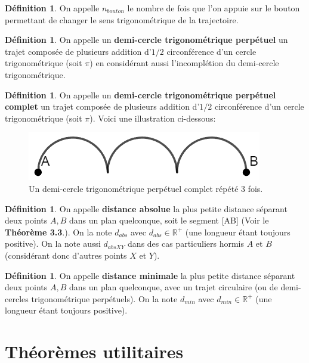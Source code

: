 \documentclass{amsart}
\theoremstyle{definition}
\newtheorem{definition}[theorem]{Définition}
\theoremstyle{remark}
\numberwithin{equation}{section}
\begin{document}
\begin{definition}
  On appelle $n_{bouton}$ le nombre de fois que l'on appuie sur le bouton permettant de changer le sens trigonométrique de la trajectoire.
\end{definition}

\begin{definition}
  On appelle un \textbf{demi-cercle trigonométrique perpétuel} un trajet composée de plusieurs addition d'$1/2$ circonférence d'un cercle trigonométrique (soit $\pi$) en considérant aussi l'incomplétion du demi-cercle trigonométrique.
\end{definition}

\begin{definition}
  On appelle un \textbf{demi-cercle trigonométrique perpétuel complet} un trajet composée de plusieurs addition d'$1/2$ circonférence d'un cercle trigonométrique (soit $\pi$). Voici une illustration ci-dessous:
  
  \begin{figure}[H]
    \centering
    \includegraphics[scale=0.5]{demicircle.png}
    \caption{Un demi-cercle trigonométrique perpétuel complet répété 3 fois.}
  \end{figure}
\end{definition}

\begin{definition}
  On appelle \textbf{distance absolue} la plus petite distance séparant deux points $A,B$ dans un plan quelconque, soit le segment [AB] (Voir le \textbf{Théorème 3.3}.). On la note $d_{abs}$ avec $d_{abs}\in\mathbb{R^+}$ (une longueur étant toujours positive). On la note 
  aussi $d_{abs XY}$ dans des cas particuliers hormis $A$ et $B$ (considérant donc d'autres points $X$ et $Y$).
\end{definition}

\begin{definition}
  On appelle \textbf{distance minimale} la plus petite distance séparant deux points $A,B$ dans un plan quelconque, avec un trajet circulaire (ou de demi-cercles trigonométrique perpétuels). On la note $d_{min}$ avec $d_{min}\in\mathbb{R^+}$ (une longueur étant toujours positive).
\end{definition}

\section{Théorèmes utilitaires}
\end{document}
